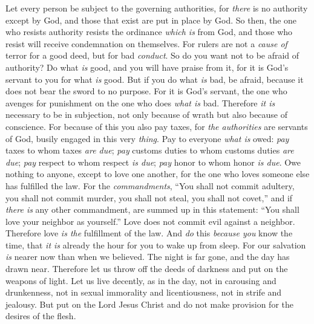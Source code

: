 \begin{biblechapter} %
 Let every person be subject to the governing authorities, for \textit{there} is no authority except by God, and those that exist are put in place by God.
\verse So then, the one who resists authority resists the ordinance \textit{which is} from God, and those who resist will receive condemnation on themselves.
\verse For rulers are not a \textit{cause of} terror for a good deed, but for bad \textit{conduct}. So do you want not to be afraid of authority? Do what \textit{is} good, and you will have praise from it,
\verse for it is God’s servant to you for what \textit{is} good. But if you do what \textit{is} bad, be afraid, because it does not bear the sword to no purpose. For it is God’s servant, the one who avenges for punishment on the one who does \textit{what is} bad.
\verse Therefore \textit{it is} necessary to be in subjection, not only because of wrath but also because of conscience.
\verse For because of this you also pay taxes, for \textit{the authorities} are servants of God, busily engaged in this very \textit{thing}.
\verse Pay to everyone \textit{what is} owed: \textit{pay} taxes to whom taxes \textit{are due}; \textit{pay} customs duties to whom customs duties \textit{are due}; \textit{pay} respect to whom respect \textit{is due}; \textit{pay} honor to whom honor \textit{is due}.
 Owe nothing to anyone, except to love one another, for the one who loves someone else has fulfilled the law.
\verse For the \textit{commandments}, “You shall not commit adultery, you shall not commit murder, you shall not steal, you shall not covet,” and if \textit{there is} any other commandment, are summed up in this statement: “You shall love your neighbor as yourself.”
\verse Love does not commit evil against a neighbor. Therefore love \textit{is the} fulfillment of the law.
\verse And \textit{do} this \textit{because you} know the time, that \textit{it is} already the hour for you to wake up from sleep. For our salvation \textit{is} nearer now than when we believed.
\verse The night is far gone, and the day has drawn near. Therefore let us throw off the deeds of darkness and put on the weapons of light.
\verse Let us live decently, as in the day, not in carousing and drunkenness, not in sexual immorality and licentiousness, not in strife and jealousy.
\verse But put on the Lord Jesus Christ and do not make provision for the desires of the flesh.
\end{biblechapter}

